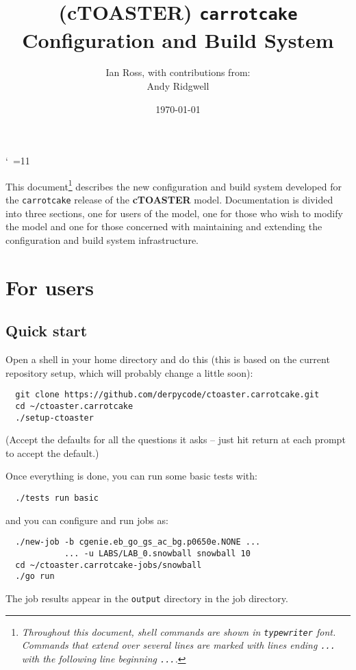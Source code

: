 \documentclass[a4paper,10pt,article]{memoir}
\title{(cTOASTER) \texttt{carrotcake} Configuration and Build System}
\author{Ian Ross, with contributions from:\\Andy Ridgwell}
\date{\today}
\begin{document}
\catcode`~=11    %

\maketitle

\noindent This document\footnote{\emph{Throughout this document, shell commands are shown in 
\texttt{typewriter} font.  Commands that extend over several lines 
are marked with lines ending \texttt{...} with the following line 
beginning \texttt{...}.}}  describes the new configuration and build system 
developed for the \texttt{carrotcake} release of the \textbf{cTOASTER} model. 
Documentation is divided into three sections, one for users of the 
model, one for those who wish to modify the model and one for those 
concerned with maintaining and extending the configuration and build 
system infrastructure.

\chapter{For users}

\section{Quick start}

Open a shell in your home directory and do this (this is based on the current repository setup, which will probably change a little soon):
\begin{verbatim}
  git clone https://github.com/derpycode/ctoaster.carrotcake.git
  cd ~/ctoaster.carrotcake
  ./setup-ctoaster
\end{verbatim}
(Accept the defaults for all the questions it asks -- just hit return at each prompt to accept the default.)

\noindent Once everything is done, you can run some basic tests with:
\begin{verbatim}
  ./tests run basic
\end{verbatim}
and you can configure and run jobs as:
\begin{verbatim}
  ./new-job -b cgenie.eb_go_gs_ac_bg.p0650e.NONE ...
            ... -u LABS/LAB_0.snowball snowball 10
  cd ~/ctoaster.carrotcake-jobs/snowball
  ./go run
\end{verbatim}
The job results appear in the \texttt{output} directory in the job
directory.
\end{document}
